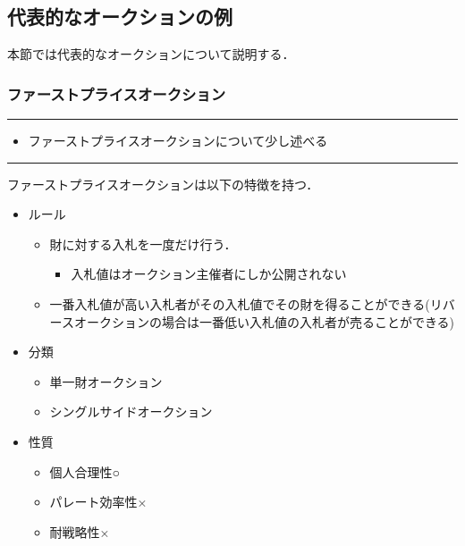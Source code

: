 \hypertarget{ux4ee3ux8868ux7684ux306aux30aaux30fcux30afux30b7ux30e7ux30f3ux306eux4f8b}{%
\subsection{代表的なオークションの例}\label{ux4ee3ux8868ux7684ux306aux30aaux30fcux30afux30b7ux30e7ux30f3ux306eux4f8b}}

本節では代表的なオークションについて説明する．

\hypertarget{ux30d5ux30a1ux30fcux30b9ux30c8ux30d7ux30e9ux30a4ux30b9ux30aaux30fcux30afux30b7ux30e7ux30f3}{%
\subsubsection{ファーストプライスオークション}\label{ux30d5ux30a1ux30fcux30b9ux30c8ux30d7ux30e9ux30a4ux30b9ux30aaux30fcux30afux30b7ux30e7ux30f3}}

\begin{center}\rule{0.5\linewidth}{0.5pt}\end{center}

\begin{itemize}
\tightlist
\item
  ファーストプライスオークションについて少し述べる
\end{itemize}

\begin{center}\rule{0.5\linewidth}{0.5pt}\end{center}

ファーストプライスオークションは以下の特徴を持つ．

\begin{itemize}
\tightlist
\item
  ルール

  \begin{itemize}
  \tightlist
  \item
    財に対する入札を一度だけ行う．

    \begin{itemize}
    \tightlist
    \item
      入札値はオークション主催者にしか公開されない
    \end{itemize}
  \item
    一番入札値が高い入札者がその入札値でその財を得ることができる(リバースオークションの場合は一番低い入札値の入札者が売ることができる)
  \end{itemize}
\item
  分類

  \begin{itemize}
  \tightlist
  \item
    単一財オークション
  \item
    シングルサイドオークション
  \end{itemize}
\item
  性質

  \begin{itemize}
  \tightlist
  \item
    個人合理性○
  \item
    パレート効率性×
  \item
    耐戦略性×
  \end{itemize}
\end{itemize}

